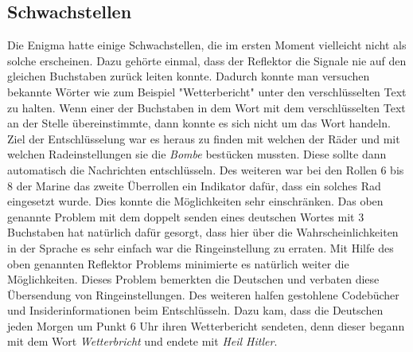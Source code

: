 \subsection{Schwachstellen}
Die Enigma hatte einige Schwachstellen, die im ersten Moment vielleicht nicht als solche erscheinen. Dazu gehörte einmal, dass der Reflektor die Signale nie auf den gleichen Buchstaben zurück leiten konnte. Dadurch konnte man versuchen bekannte Wörter wie zum Beispiel "Wetterbericht" unter den verschlüsselten Text zu halten. Wenn einer der Buchstaben in dem Wort mit dem verschlüsselten Text an der Stelle übereinstimmte, dann konnte es sich nicht um das Wort handeln. Ziel der Entschlüsselung war es heraus zu finden mit welchen der Räder und mit welchen Radeinstellungen sie die \emph{Bombe} bestücken mussten. Diese sollte dann automatisch die Nachrichten entschlüsseln. Des weiteren war bei den Rollen 6 bis 8 der Marine das zweite Überrollen ein Indikator dafür, dass ein solches Rad eingesetzt wurde. Dies konnte die Möglichkeiten sehr einschränken. Das oben genannte Problem mit dem doppelt senden eines deutschen Wortes mit 3 Buchstaben hat natürlich dafür gesorgt, dass hier über die Wahrscheinlichkeiten in der Sprache es sehr einfach war die Ringeinstellung zu erraten. Mit Hilfe des oben genannten Reflektor Problems minimierte es natürlich weiter die Möglichkeiten. Dieses Problem bemerkten die Deutschen und verbaten diese Übersendung von Ringeinstellungen. Des weiteren halfen gestohlene Codebücher und Insiderinformationen beim Entschlüsseln. Dazu kam, dass die Deutschen jeden Morgen  um Punkt 6 Uhr ihren Wetterbericht sendeten, denn dieser begann mit dem Wort \emph{Wetterbricht} und endete mit \emph{Heil Hitler}. \cite{enigmaflaw} \cite{enigmaproblem1}